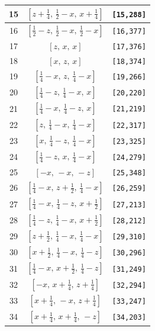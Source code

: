 \documentclass[fleqn,8pt]{jsarticle}
\begin{document}
\begin{longtable}{ccc}
15 & $\left[ z + \frac{1}{4},\, \frac{1}{2} - x,\, x + \frac{1}{4} \right]$ & {\tt [15,288]} \\ \hline
16 & $\left[ \frac{1}{2} - z,\, \frac{1}{2} - x,\, \frac{1}{2} - x \right]$ & {\tt [16,377]} \\ \hline
17 & $\left[ z,\, x,\, x \right]$ & {\tt [17,376]} \\ \hline
18 & $\left[ x,\, z,\, x \right]$ & {\tt [18,374]} \\ \hline
19 & $\left[ \frac{1}{4} - x,\, z,\, \frac{1}{4} - x \right]$ & {\tt [19,266]} \\ \hline
20 & $\left[ \frac{1}{4} - z,\, \frac{1}{4} - x,\, x \right]$ & {\tt [20,220]} \\ \hline
21 & $\left[ \frac{1}{4} - x,\, \frac{1}{4} - z,\, x \right]$ & {\tt [21,219]} \\ \hline
22 & $\left[ z,\, \frac{1}{4} - x,\, \frac{1}{4} - x \right]$ & {\tt [22,317]} \\ \hline
23 & $\left[ x,\, \frac{1}{4} - z,\, \frac{1}{4} - x \right]$ & {\tt [23,325]} \\ \hline
24 & $\left[ \frac{1}{4} - z,\, x,\, \frac{1}{4} - x \right]$ & {\tt [24,279]} \\ \hline
25 & $\left[ - x,\, - x,\, - z \right]$ & {\tt [25,348]} \\ \hline
26 & $\left[ \frac{1}{4} - x,\, z + \frac{1}{2},\, \frac{1}{4} - x \right]$ & {\tt [26,259]} \\ \hline
27 & $\left[ \frac{1}{4} - x,\, \frac{1}{4} - z,\, x + \frac{1}{2} \right]$ & {\tt [27,213]} \\ \hline
28 & $\left[ \frac{1}{4} - z,\, \frac{1}{4} - x,\, x + \frac{1}{2} \right]$ & {\tt [28,212]} \\ \hline
29 & $\left[ z + \frac{1}{2},\, \frac{1}{4} - x,\, \frac{1}{4} - x \right]$ & {\tt [29,310]} \\ \hline
30 & $\left[ x + \frac{1}{2},\, \frac{1}{4} - x,\, \frac{1}{4} - z \right]$ & {\tt [30,296]} \\ \hline
31 & $\left[ \frac{1}{4} - x,\, x + \frac{1}{2},\, \frac{1}{4} - z \right]$ & {\tt [31,249]} \\ \hline
32 & $\left[ - x,\, x + \frac{1}{4},\, z + \frac{1}{4} \right]$ & {\tt [32,294]} \\ \hline
33 & $\left[ x + \frac{1}{4},\, - x,\, z + \frac{1}{4} \right]$ & {\tt [33,247]} \\ \hline
34 & $\left[ x + \frac{1}{4},\, x + \frac{1}{4},\, - z \right]$ & {\tt [34,203]} \\ \hline

\end{longtable}
\end{document}
